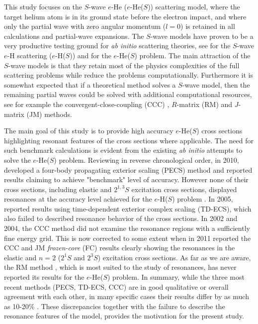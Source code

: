 \documentclass[aip
, pra
, showpacs
, aps
, twocolumn
, groupedaddress
, floatfix
]{revtex4}
\begin{document}
This study focuses on the $S$-wave $e$-He ($e$-He($S$)) scattering model,
where the target helium atom is in its ground state before the electron impact,
and where only the partial wave with zero angular momentum ($l=0$) is retained in all calculations
and partial-wave expansions.
The $S$-wave models have proven to be a very productive testing ground for {\it ab initio} scattering theories,
see \cite{T62,HY74p1209,P78,P80,P81,CO84,BS92p53,BST93,KM94pL407,IDHF95,PS96,JS02,JS00l,BRIM99,S99l,MHR02,BS04,Frapiccini10} for the $S$-wave $e$-H scattering ($e$-H($S$))
and \cite{DHIF94,PMR99,PBFS02,PNBFS04,HMR05R,HMR05,BS10p022715,BS10p022716,KFB11} for  the $e$-He($S$) problem.
The main attraction of the $S$-wave models is that they retain most of the physics complexities of the full
scattering problems while reduce the problems computationally.
Furthermore it is somewhat expected that if a theoretical method solves a $S$-wave model, then
the remaining partial waves could be solved with additional computational resources,
see for example the convergent-close-coupling (CCC) \cite{FB95},
$R$-matrix (RM) \cite{FLRS94b, PhysRevA.54.R998, SMC2006}
and $J$-matrix (JM) \cite{KM94pL741,KM95pL139} methods.


The main goal of this study is to provide high accuracy $e$-He($S$) cross sections highlighting resonant features of the cross sections where applicable.
The need for such benchmark calculations is evident from the existing {\em ab initio} attempts to solve the $e$-He($S$) problem.
Reviewing in reverse chronological order, in 2010, \citet{BS10p022715} developed a four-body propagating exterior scaling (PECS) method and reported results claiming to achieve "benchmark" level of accuracy.
However none of their cross sections, including elastic and $2^{1,3}S$ excitation cross sections,
displayed resonances at the accuracy level achieved for the $e$-H($S$) problem \cite{P78}.
In 2005, \citet{HMR05} reported results using
time-dependent exterior complex scaling (TD-ECS), which also failed to described resonance behavior of the cross sections.
In 2002 and 2004, the CCC method \cite{PBFS02,PNBFS04} did not examine the resonance regions with a sufficiently fine energy grid.
This is now corrected to some extent when in 2011 \citet{KFB11} reported the CCC and JM {\em frozen-core}
(FC) results clearly showing the resonances in the elastic and $n=2$ ($2^1S$ and $2^3S$) excitation cross sections.
As far as we are aware, the RM method \cite{FLRS94b, SMC2006}, which is most suited to the study of resonances,
has never reported its results for the $e$-He($S$) problem.
In summary, while the three most recent methods (PECS, TD-ECS, CCC) are in good qualitative or overall agreement with each other,
in many specific cases their results differ by as much as 10-20\% \cite{BS10p022715,HMR05}.
These discrepancies together with the failure to describe the resonance features of the model,
provides the motivation for the present study.
\end{document}
